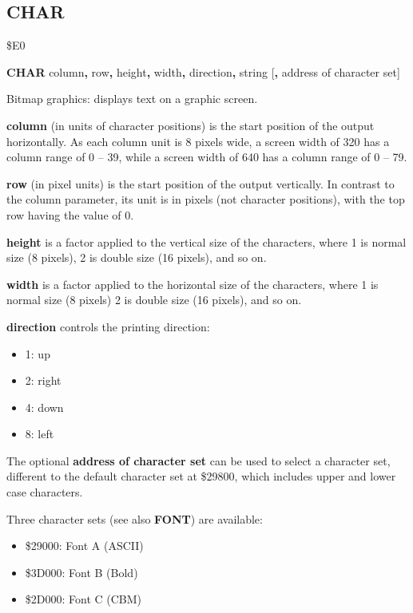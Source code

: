 \subsection{CHAR}
\begin{description}[leftmargin=2cm,style=nextline]
\item [Token:]   \$E0

\item [Format:]  {\bf CHAR} column{\bf,} row{\bf,} height{\bf,} width{\bf,} direction{\bf,} string [{\bf,} address of character set]

\item [Usage:]   Bitmap graphics: displays text on a graphic screen.

                 {\bf column} (in units of character positions) is the start position of the output horizontally. As each column unit is 8 pixels wide, a screen width of 320 has a column range of 0 -- 39, while a screen width of 640 has a column range of 0 -- 79.

                 {\bf row} (in pixel units) is the start position of the output vertically. In contrast to the column parameter, its unit is in pixels (not character positions), with the top row having the value of 0.

                 {\bf height} is a factor applied to the vertical size of the characters, where 1 is normal size (8 pixels), 2 is double size (16 pixels), and so on.

                 {\bf width} is a factor applied to the horizontal size of the characters, where 1 is normal size (8 pixels) 2 is double size (16 pixels), and so on.

                 {\bf direction} controls the printing direction:
                 \begin{itemize}
                    \item 1: up
                    \item 2: right
                    \item 4: down
                    \item 8: left
                 \end{itemize}

                 The optional {\bf address of character set} can be used to select a character set, different to the default character set at \$29800, which includes upper and lower case characters.

                 Three character sets (see also {\bf FONT}) are available:
                 \begin{itemize}
                    \item \$29000: Font A (ASCII)
                    \item \$3D000: Font B (Bold)
                    \item \$2D000: Font C (CBM)
                 \end{itemize}


\end{description}

